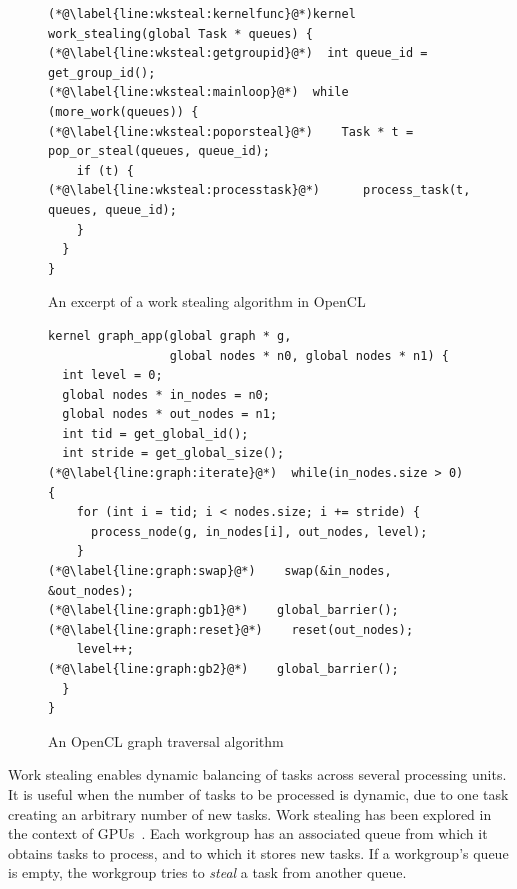\documentclass[parskip=half,sigconf,review, anonymous=true, acmcopyrightmode=none]{acmart}
\begin{document}
\begin{figure}

\begin{lstlisting}
(*@\label{line:wksteal:kernelfunc}@*)kernel work_stealing(global Task * queues) {
(*@\label{line:wksteal:getgroupid}@*)  int queue_id = get_group_id();
(*@\label{line:wksteal:mainloop}@*)  while (more_work(queues)) {
(*@\label{line:wksteal:poporsteal}@*)    Task * t = pop_or_steal(queues, queue_id);
    if (t) {
(*@\label{line:wksteal:processtask}@*)      process_task(t, queues, queue_id);
    }
  }
}
\end{lstlisting}
\caption{An excerpt of a work stealing algorithm in OpenCL}\label{fig:workstealing}
\end{figure}

\begin{figure}

\begin{lstlisting}
kernel graph_app(global graph * g, 
                 global nodes * n0, global nodes * n1) {
  int level = 0;
  global nodes * in_nodes = n0;
  global nodes * out_nodes = n1;
  int tid = get_global_id();
  int stride = get_global_size();
(*@\label{line:graph:iterate}@*)  while(in_nodes.size > 0) {
    for (int i = tid; i < nodes.size; i += stride) {
      process_node(g, in_nodes[i], out_nodes, level);
    }
(*@\label{line:graph:swap}@*)    swap(&in_nodes, &out_nodes);
(*@\label{line:graph:gb1}@*)    global_barrier();
(*@\label{line:graph:reset}@*)    reset(out_nodes);
    level++;
(*@\label{line:graph:gb2}@*)    global_barrier();
  }
}
\end{lstlisting}
\caption{An OpenCL graph traversal algorithm}\label{fig:graphsearch}
\end{figure}

%
Work stealing enables dynamic balancing of tasks across several
processing units. It is useful when the number of tasks to be
processed is dynamic, due to one task creating an arbitrary number of
new tasks.  Work stealing has been explored in the context of
GPUs~\cite{DBLP:conf/egh/CedermanT08,TPO10}. Each workgroup has an
associated queue from which it obtains tasks to process, and to which
it stores new tasks. If a workgroup's queue is empty, the workgroup
tries to \emph{steal} a task from another queue.
\end{document}
